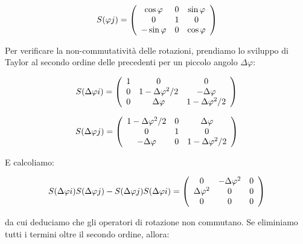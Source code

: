 	\begin{equation}
		S(\varphi j) = 
		\left ( \begin{array}{c c c}
			\cos \varphi & 0 & \sin \varphi \\
			0 & 1 & 0 \\
			-\sin \varphi & 0 & \cos \varphi \\
		\end{array} \right )
	\end{equation}

Per verificare la non-commutativit\`a delle rotazioni, prendiamo lo sviluppo di Taylor al secondo ordine delle precedenti per un piccolo angolo $\Delta \varphi$:

	\begin{equation}
		S(\Delta \varphi i) = 
		\left ( \begin{array}{c c c}
			1 & 0 & 0 \\
			0 & 1 - \Delta \varphi^2 / 2 & - \Delta \varphi \\
			0 & \Delta \varphi & 1 - \Delta \varphi^2 / 2 \\
		\end{array} \right )
	\end{equation}

	\begin{equation}
		S(\Delta \varphi j) = 
		\left ( \begin{array}{c c c}
			1 - \Delta \varphi^2 / 2 & 0 & \Delta \varphi \\
			0 & 1 & 0 \\
			-\Delta \varphi & 0 & 1 - \Delta \varphi^2 / 2 \\
		\end{array} \right )
	\end{equation}

E calcoliamo:

	\begin{equation}
		S(\Delta \varphi i) S(\Delta \varphi j) - S(\Delta \varphi j) S(\Delta \varphi i) =
			\left ( \begin{array}{c c c}
				0 & - \Delta \varphi^2 & 0 \\
				\Delta \varphi^2 & 0 & 0 \\
				0 & 0 & 0 \\
			\end{array} \right )
	\end{equation}

da cui deduciamo che gli operatori di rotazione non commutano. Se eliminiamo tutti i termini oltre il secondo ordine, allora:
	
